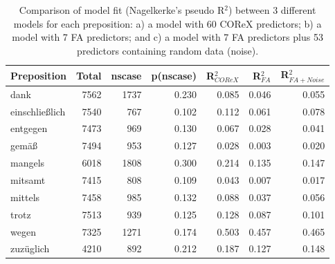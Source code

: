 \begin{table}
  \begin{tabular}{lrrrrrr}
  \toprule
            Preposition  & Total  & nscase & p(nscase) & R$^2_{COReX}$ & R$^2_{FA}$ & R$^2_{FA+Noise}$\\
  \midrule
            dank  & 7562   & 1737   & 0.230    & 0.085   & 0.046  & 0.055 \\
  einschließlich  & 7540   &  767   & 0.102    & 0.112   & 0.061  & 0.078 \\
        entgegen  & 7473   &  969   & 0.130    & 0.067   & 0.028  & 0.041 \\
           gemäß  & 7494   &  953   & 0.127    & 0.028   & 0.003  & 0.020 \\
         mangels  & 6018   & 1808   & 0.300    & 0.214   & 0.135  & 0.147 \\
         mitsamt  & 7415   &  808   & 0.109    & 0.043   & 0.007  & 0.017 \\
         mittels  & 7458   &  985   & 0.132    & 0.088   & 0.037  & 0.056 \\
           trotz  & 7513   &  939   & 0.125    & 0.128   & 0.087  & 0.101 \\
           wegen  & 7325   & 1271   & 0.174    & 0.503   & 0.457  & 0.465 \\
       zuzüglich  & 4210   &  892   & 0.212    & 0.187   & 0.127  & 0.148 \\
  \bottomrule
  \end{tabular}
  \caption{Comparison of model fit (Nagelkerke's pseudo R$^2$) between 3 different models for each preposition: a) a model with 60 COReX predictors; b) a model with 7 FA predictors; and c) a model with 7 FA predictors plus 53 predictors containing random data (noise). %
  }\label{prepositions-glm-comparison}  
\end{table}


